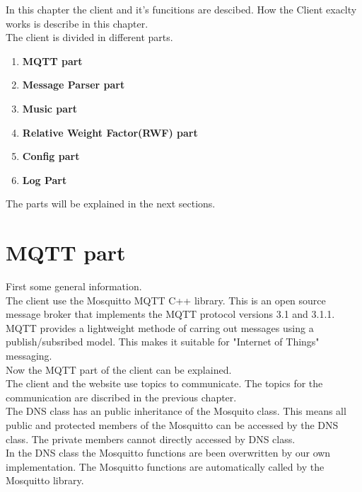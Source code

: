 In this chapter the client and it's funcitions are descibed. How the Client exaclty works is describe in this chapter.\\

The client is divided in different parts.
\small {
\begin{enumerate}
	\item 	{\bf MQTT part }
	\item 	{\bf Message Parser part}
	\item	{\bf Music part }
	\item	{\bf Relative Weight Factor(RWF) part }
	\item	{\bf Config part} 
	\item 	{\bf Log Part\\}
\end{enumerate}
}

The parts will be explained in the next sections.

\section{MQTT part}

First some general information.\\

The client use the Mosquitto MQTT C++ library. This is an open source message broker that implements the MQTT protocol versions 3.1 and 3.1.1.\\

MQTT provides a lightweight methode of carring out messages using a publish/subsribed model. This makes it suitable for "Internet of Things" messaging.\\

Now the MQTT part of the client can be explained.\\

The client and the website use topics to communicate. The topics for the communication are discribed in the previous chapter.\\

The DNS class has an public inheritance of the Mosquito class. This means all public and protected members of the Mosquitto can be accessed by the DNS class. The private members cannot directly accessed by DNS class.\\

In the DNS class the Mosquitto functions are been overwritten by our own implementation. The Mosquitto functions are automatically called by the Mosquitto library.\\

